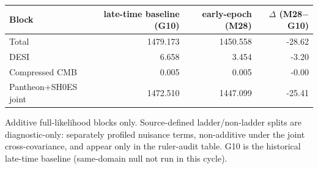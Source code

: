 \begin{tabular}{lrrr}
\toprule
Block & late-time baseline {\small (G10)} & early-epoch {\small (M28)} & $\Delta$ (M28$-$G10) \\
\midrule
Total & 1479.173 & 1450.558 & -28.62 \\
DESI & 6.658 & 3.454 & -3.20 \\
Compressed CMB & 0.005 & 0.005 & -0.00 \\
Pantheon+SH0ES joint & 1472.510 & 1447.099 & -25.41 \\
\bottomrule
\end{tabular}

{\small Additive full-likelihood blocks only. Source-defined ladder/non-ladder splits are diagnostic-only: separately profiled nuisance terms, non-additive under the joint cross-covariance, and appear only in the ruler-audit table. G10 is the historical late-time baseline (same-domain null not run in this cycle).\par}
